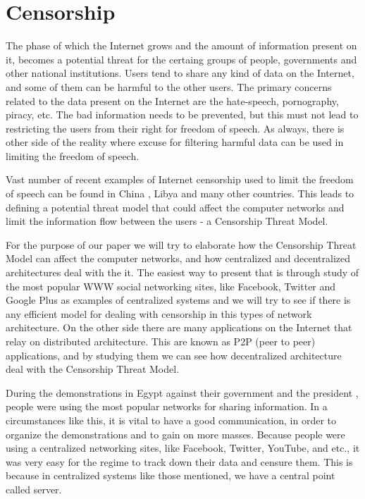 \section{Censorship}
The phase of which the Internet grows and the amount of information present on it, becomes a potential threat for the certaing groups of people, governments and other national institutions. Users tend to share any kind of data on the Internet, and some of them can be harmful to the other users. The primary concerns related to the data present on the Internet are the hate-speech, pornography, piracy, etc. The bad information needs to be prevented, but this must not lead to restricting the users from their right for freedom of speech. As always, there is other side of the reality where excuse for filtering harmful data can be used in limiting the freedom of speech. 

Vast number of recent examples of Internet censorship used to limit the freedom of speech can be found in China \cite{canaves}, Libya \cite{dianotti2011}and many other countries. 
This leads to defining a potential threat model that could affect the computer networks and limit the information flow between the users - a Censorship Threat Model.

For the purpose of our paper we will try to elaborate how the Censorship Threat Model can affect the computer networks, and how centralized and decentralized architectures deal with the it. The easiest way to present that is through study of the most popular WWW social networking sites, like Facebook, Twitter and Google Plus as examples of centralized systems and we will try to see if there is any efficient model for dealing with censorship in this types of network architecture. On the other side there are many applications on the Internet that relay on distributed architecture. This are known as P2P (peer to peer) applications, and by studying them we can see how decentralized architecture deal with the Censorship Threat Model.

During the demonstrations in Egypt against their government and the president \cite{web:scialnetworkcriticalmass}, people were using the most popular networks for sharing information. In a circumstances like this, it is vital to have a good communication, in order to organize the demonstrations and to gain on more masses. 
Because people were using a centralized networking sites, like Facebook, Twitter, YouTube, and etc., it was very easy for the regime to track down their data and censure them. This is because in centralized systems like those mentioned, we have a central point called server. 

